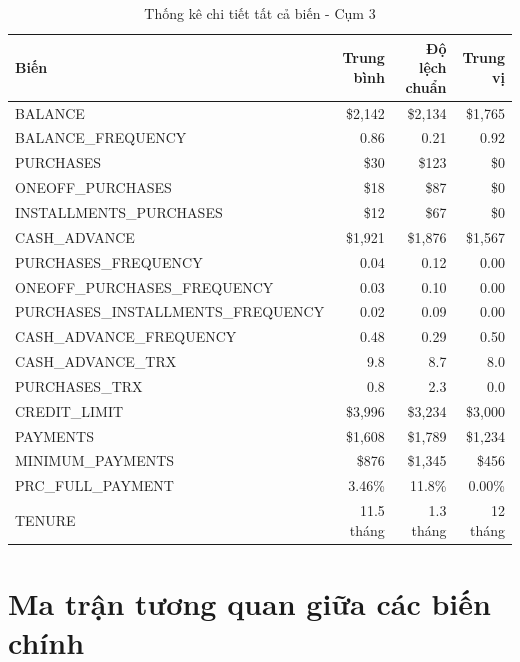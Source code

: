 \begin{table}[H]
\centering
\caption{Thống kê chi tiết tất cả biến - Cụm 3}
\small
\begin{tabular}{|l|r|r|r|}
\hline
\textbf{Biến} & \textbf{Trung bình} & \textbf{Độ lệch chuẩn} & \textbf{Trung vị} \\
\hline
BALANCE & \$2,142 & \$2,134 & \$1,765 \\
\hline
BALANCE\_FREQUENCY & 0.86 & 0.21 & 0.92 \\
\hline
PURCHASES & \$30 & \$123 & \$0 \\
\hline
ONEOFF\_PURCHASES & \$18 & \$87 & \$0 \\
\hline
INSTALLMENTS\_PURCHASES & \$12 & \$67 & \$0 \\
\hline
CASH\_ADVANCE & \$1,921 & \$1,876 & \$1,567 \\
\hline
PURCHASES\_FREQUENCY & 0.04 & 0.12 & 0.00 \\
\hline
ONEOFF\_PURCHASES\_FREQUENCY & 0.03 & 0.10 & 0.00 \\
\hline
PURCHASES\_INSTALLMENTS\_FREQUENCY & 0.02 & 0.09 & 0.00 \\
\hline
CASH\_ADVANCE\_FREQUENCY & 0.48 & 0.29 & 0.50 \\
\hline
CASH\_ADVANCE\_TRX & 9.8 & 8.7 & 8.0 \\
\hline
PURCHASES\_TRX & 0.8 & 2.3 & 0.0 \\
\hline
CREDIT\_LIMIT & \$3,996 & \$3,234 & \$3,000 \\
\hline
PAYMENTS & \$1,608 & \$1,789 & \$1,234 \\
\hline
MINIMUM\_PAYMENTS & \$876 & \$1,345 & \$456 \\
\hline
PRC\_FULL\_PAYMENT & 3.46\% & 11.8\% & 0.00\% \\
\hline
TENURE & 11.5 tháng & 1.3 tháng & 12 tháng \\
\hline
\end{tabular}
\end{table}

\section{Ma trận tương quan giữa các biến chính}

